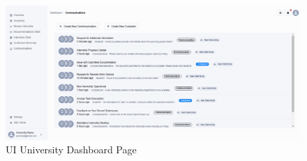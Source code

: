 \begin{figure}[H]
    \centering
    \includegraphics[width=\textwidth]{Latex/Images/New Ui/Uni-Dashboard.png}
    \caption{UI University Dashboard Page}
    \label{fig:universityDashboard}
\end{figure}